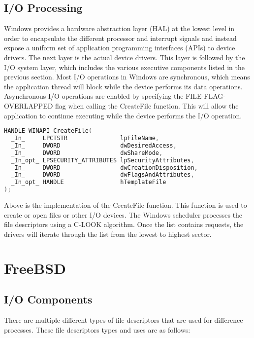 \documentclass[letterpaper,draftclsnofoot,10pt,onecolumn,titlepage]{IEEEtran}\usepackage[margin=0.75in]{geometry}
\begin{document}
\subsection{I/O Processing}
Windows provides a hardware abstraction layer (HAL) at the lowest level in order to encapsulate the different
processor and interrupt signals and instead expose a uniform set of application programming interfaces (APIs)
to device drivers. The next layer is the actual device drivers. This layer is followed by the I/O system
layer, which includes the various executive components listed in the previous section. Most I/O
operations in Windows are synchronous, which means the application thread will block while the device
performs its data operations. Asynchronous I/O operations are enabled by specifying the FILE-FLAG-OVERLAPPED
flag when calling the CreateFile function. This will allow the application to continue executing while the
device performs the I/O operation.

\begin{lstlisting}[language=C++]
HANDLE WINAPI CreateFile(
  _In_     LPCTSTR               lpFileName,
  _In_     DWORD                 dwDesiredAccess,
  _In_     DWORD                 dwShareMode,
  _In_opt_ LPSECURITY_ATTRIBUTES lpSecurityAttributes,
  _In_     DWORD                 dwCreationDisposition,
  _In_     DWORD                 dwFlagsAndAttributes,
  _In_opt_ HANDLE                hTemplateFile
); 
\end{lstlisting}

Above is the implementation of the CreateFile function. This function is used to create or open files or
other I/O devices. The Windows scheduler processes the file descriptors using a C-LOOK algorithm. Once
the list contains requests, the drivers will iterate through the list from the lowest to highest sector.

\section{FreeBSD}

\subsection{I/O Components}
There are multiple different types of file descriptors that are used for difference processes. These 
file descriptors types and uses are as follows:
\end{document}
